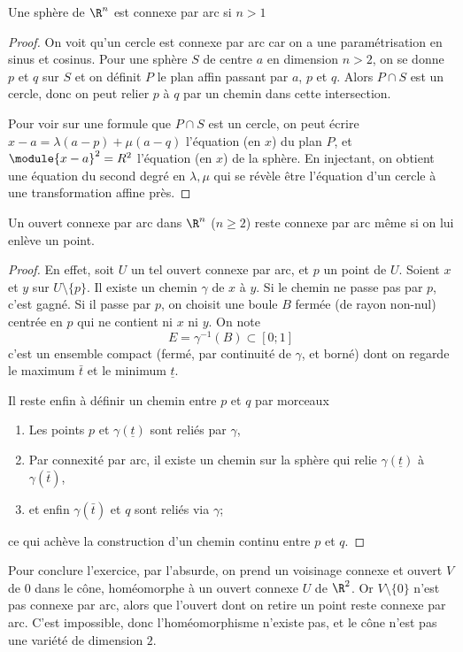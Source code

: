  \begin{lem}Une sphère de $\R^n$ est connexe par arc si $n >
   1$\end{lem}
 \begin{proof}On voit qu'un cercle est connexe par arc car on a une
   paramétrisation en sinus et cosinus. Pour une sphère $S$ de centre
   $a$ en dimension $n > 2$, on se donne $p$ et $q$ sur $S$ et on
   définit $P$ le plan affin passant par $a$, $p$ et $q$. Alors $P
   \cap S$ est un cercle, donc on peut relier $p$ à $q$ par un chemin
   dans cette intersection.

   Pour voir sur une formule que $P \cap S$ est un cercle, on peut
   écrire $x - a = \lambda(a-p) + \mu(a-q)$ l'équation (en $x$) du
   plan $P$, et $\module{x-a}^2 = R^2$ l'équation (en $x$) de la
   sphère. En injectant, on obtient une équation du second degré en
   $\lambda,\mu$ qui se révèle être l'équation d'un cercle à une
   transformation affine près.
 \end{proof}

 \begin{lem}Un ouvert connexe par arc dans $\R^n$ ($n \geq 2$) reste
   connexe par arc même si on lui enlève un point.\end{lem}
 \begin{proof}
   En effet, soit $U$ un tel ouvert connexe par arc, et $p$ un point
   de $U$. Soient $x$ et $y$ sur $U\setminus\{p\}$. Il existe un
   chemin $\gamma$ de $x$ à $y$. Si le chemin ne passe pas par $p$,
   c'est gagné. Si il passe par $p$, on choisit une boule $B$ fermée
   (de rayon non-nul) centrée en $p$ qui ne contient ni $x$ ni
   $y$. On note
   \[E = \gamma^{-1}(B) \subset [0;1]\] c'est un ensemble compact
   (fermé, par continuité de $\gamma$, et borné) dont on regarde le
   maximum $\bar t$ et le minimum $\underline t$.

   Il reste enfin à définir un chemin entre $p$ et $q$ par morceaux
   \begin{enumerate}
   \item Les points $p$ et $\gamma(\underline t)$ sont reliés par
     $\gamma$,
   \item Par connexité par arc, il existe un chemin sur la sphère qui
     relie $\gamma(\underline t)$ à $\gamma(\bar t)$,
   \item et enfin $\gamma(\bar t)$ et $q$ sont reliés via $\gamma$;
   \end{enumerate}
   ce qui achève la construction d'un chemin continu entre $p$ et
   $q$.
 \end{proof}
 Pour conclure l'exercice, par l'absurde, on prend un voisinage
 connexe et ouvert $V$ de $0$ dans le cône, homéomorphe à un ouvert
 connexe $U$ de $\R^2$. Or $V\setminus\{0\}$ n'est pas connexe par
 arc, alors que l'ouvert dont on retire un point reste connexe par
 arc. C'est impossible, donc l'homéomorphisme n'existe pas, et le
 cône n'est pas une variété de dimension $2$.
